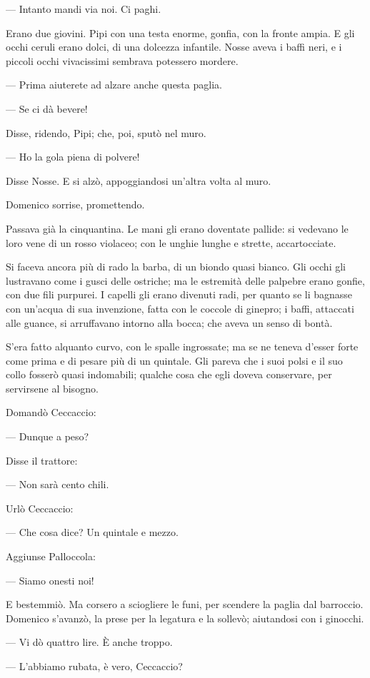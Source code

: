 — Intanto mandi via noi. Ci paghi.

Erano due giovini. Pipi con una testa enorme, gonfia, con la fronte ampia. E gli occhi ceruli erano dolci, di una dolcezza infantile. Nosse aveva i baffi neri, e i piccoli occhi vivacissimi sembrava potessero mordere.

— Prima aiuterete ad alzare anche questa paglia.

— Se ci dà bevere!

Disse, ridendo, Pipi; che, poi, sputò nel muro.

— Ho la gola piena di polvere!

Disse Nosse. E si alzò, appoggiandosi un’altra volta al muro.

Domenico sorrise, promettendo.

Passava già la cinquantina. Le mani gli erano doventate pallide: si vedevano le loro vene di un rosso violaceo; con le unghie lunghe e strette, accartocciate.

Si faceva ancora più di rado la barba, di un biondo quasi bianco. Gli occhi gli lustravano come i gusci delle ostriche; ma le estremità delle palpebre erano gonfie, con due fili purpurei. I capelli gli erano divenuti radi, per quanto se li bagnasse con un’acqua di sua invenzione, fatta con le coccole di ginepro; i baffi, attaccati alle guance, si arruffavano intorno alla bocca; che aveva un senso di bontà.

S’era fatto alquanto curvo, con le spalle ingrossate; ma se ne teneva d’esser forte come prima e di pesare più di un quintale. Gli pareva che i suoi polsi e il suo collo fosserò quasi indomabili; qualche cosa che egli doveva conservare, per servirsene al bisogno.

Domandò Ceccaccio:

— Dunque a peso?

Disse il trattore:

— Non sarà cento chili.

Urlò Ceccaccio:

— Che cosa dice? Un quintale e mezzo.

Aggiunse Palloccola:

— Siamo onesti noi!

E bestemmiò. Ma corsero a sciogliere le funi, per scendere la paglia dal barroccio. Domenico s’avanzò, la prese per la legatura e la sollevò; aiutandosi con i ginocchi.

— Vi dò quattro lire. È anche troppo.

— L’abbiamo rubata, è vero, Ceccaccio?

